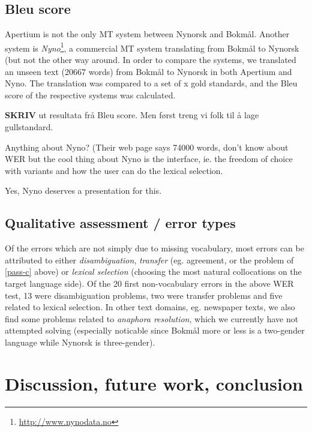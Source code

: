 \documentclass[11pt]{article}
\begin{document}
\subsection{Bleu score}

Apertium is not the only MT system between Nynorsk and Bokmål. Another
system is
\textit{Nyno}\footnote{\href{http://www.nynodata.no}{http://www.nynodata.no}},
a commercial MT system translating from Bokmål to Nynorsk (but not the
other way around. In order to compare the systems, we translated an
unseen text (20667 words) from Bokmål to Nynorsk in both Apertium and
Nyno. The translation was compared to a set of x gold standards, and
the Bleu score of the respective systems was calculated.

\textbf{SKRIV} ut resultata frå Bleu score. Men først treng vi folk til å lage gullstandard.

Anything about Nyno? (Their web page says 74000 words, don't know
  about WER but the cool thing about Nyno is the interface, ie. the
  freedom of choice with variants and how the user can do the lexical
  selection.
  
  Yes, Nyno deserves a presentation for this.
\subsection{Qualitative assessment / error types}
Of the errors which are not simply due to missing vocabulary, most
errors can be attributed to either \emph{disambiguation},
\emph{transfer} (eg. agreement, or the problem of \ref{pass-c} above)
or \emph{lexical
  selection} (choosing the most natural collocations on the target
language side). Of the 20 first non-vocabulary errors in the above WER
test, 13 were disambiguation problems, two were transfer problems and
five related to lexical selection. In other text domains, eg.
newspaper texts, we also find some problems related to \emph{anaphora
  resolution}, which we currently have not attempted solving
(especially noticable since Bokmål more or less is a two-gender
language while Nynorsk is three-gender).

\section{Discussion, future work, conclusion}
\end{document}
